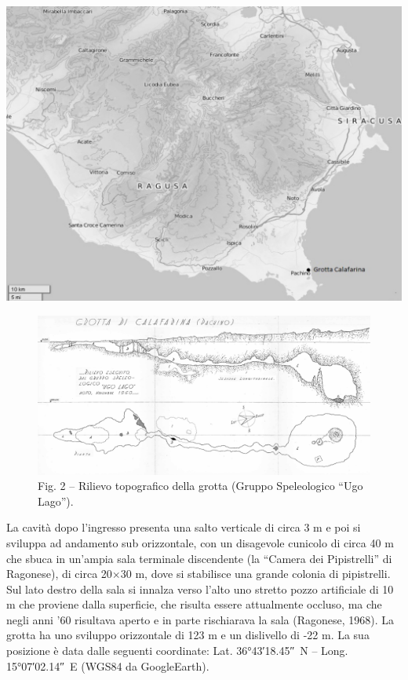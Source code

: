 \begin{multicols}{2}
\begin{Figure} %
  \centering\small
  \includegraphics[width=\linewidth]{abstracts/extended_abstracts/C018_Figure1.png}
\end{Figure}
\begin{figure}[t] %
  \centering\small
  \includegraphics[width=\linewidth]{abstracts/extended_abstracts/C018_Figure2.png}
  \caption*{Fig. 2 – Rilievo topografico della grotta (Gruppo Speleologico ``Ugo Lago'').}
\end{figure}

La cavità dopo l’ingresso presenta una salto verticale di circa 3 m e poi si sviluppa ad andamento sub orizzontale, con un disagevole cunicolo di circa 40 m che sbuca in un’ampia sala terminale discendente (la ``Camera dei Pipistrelli'' di Ragonese), di circa 20$\times$30 m, dove si stabilisce una grande colonia di pipistrelli. Sul lato destro della sala si innalza verso l’alto uno stretto pozzo artificiale di 10 m che proviene dalla superficie, che risulta essere attualmente occluso, ma che negli anni '60 risultava aperto e in parte rischiarava la sala (Ragonese, 1968). La grotta ha uno sviluppo orizzontale di 123 m e un dislivello di -22 m. La sua posizione è data dalle seguenti coordinate: Lat.  \ang{36;43;18.45}~N – Long. \ang{15;07;02.14}~E (WGS84 da GoogleEarth).


\end{multicols}

